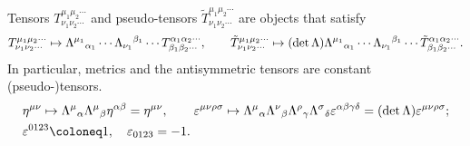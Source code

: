 \documentclass[CheatSheet]{subfiles}
\begin{document}
Tensors $T^{\mu_1\mu_2\cdots}_{\nu_1\nu_2\cdots}$ and pseudo-tensors $\tilde T^{\mu_1\mu_2\cdots}_{\nu_1\nu_2\cdots}$ are objects that satisfy
\begin{equation}
 T^{\mu_1\mu_2\cdots}_{\nu_1\nu_2\cdots}\mapsto
\Lambda^{\mu_1}{}_{\alpha_1}\cdots
\Lambda_{\nu_1}{}^{\beta_1}\cdots
 T^{\alpha_1\alpha_2\cdots}_{\beta_1\beta_2\cdots},
\qquad
 \tilde T^{\mu_1\mu_2\cdots}_{\nu_1\nu_2\cdots}\mapsto(\det\Lambda)
\Lambda^{\mu_1}{}_{\alpha_1}\cdots
\Lambda_{\nu_1}{}^{\beta_1}\cdots
 \tilde T^{\alpha_1\alpha_2\cdots}_{\beta_1\beta_2\cdots}.
\end{equation}
In particular, metrics and the antisymmetric tensors are constant (pseudo-)tensors.
\begin{align}
&\eta^{\mu\nu}\mapsto \LorTr\mu\alpha\LorTr\mu\beta\eta^{\alpha\beta}=\eta^{\mu\nu},\qquad
 \vep^{\mu\nu\rho\sigma}\mapsto \LorTr\mu\alpha\LorTr\nu\beta\LorTr\rho\gamma\LorTr\sigma\delta\vep^{\alpha\beta\gamma\delta}=(\det\Lambda)\vep^{\mu\nu\rho\sigma};\\
&\vep^{0123}\deq1,\quad \vep_{0123}=-1.
\end{align}
\end{document}
